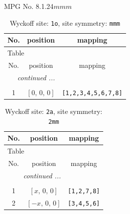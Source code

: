 \documentclass[fleqn,8pt]{jsarticle}
\begin{document}
\setcounter{MaxMatrixCols}{32}

\renewcommand{\tablename}{Table~}
\renewcommand{\figurename}{Figure~}
\begin{center}
\LARGE
MPG No. 8.1.24\quad$mmm$
\end{center}
\renewcommand{\arraystretch}{1.2}
\begin{longtable}{ccc}
\caption{Wyckoff site: {\tt 1o}, site symmetry: {\tt mmm}}
 \\
 \hline \hline
No. & position & mapping \\ \hline \endfirsthead

\multicolumn{2}{l}{\tablename\ \thetable{}} \\
 \hline \hline
No. & position & mapping \\ \hline \endhead

 \hline \hline
\multicolumn{2}{r}{\footnotesize\it continued ...} \\ \endfoot

 \hline \hline
\multicolumn{2}{r}{} \\ \endlastfoot

1 & $\left[ 0,\, 0,\, 0 \right]$ & {\tt [1,2,3,4,5,6,7,8]} \\
\end{longtable}
\renewcommand{\arraystretch}{1.2}
\begin{longtable}{ccc}
\caption{Wyckoff site: {\tt 2a}, site symmetry: {\tt 2mm}}
 \\
 \hline \hline
No. & position & mapping \\ \hline \endfirsthead

\multicolumn{2}{l}{\tablename\ \thetable{}} \\
 \hline \hline
No. & position & mapping \\ \hline \endhead

 \hline \hline
\multicolumn{2}{r}{\footnotesize\it continued ...} \\ \endfoot

 \hline \hline
\multicolumn{2}{r}{} \\ \endlastfoot

1 & $\left[ x,\, 0,\, 0 \right]$ & {\tt [1,2,7,8]} \\ \hline
2 & $\left[ - x,\, 0,\, 0 \right]$ & {\tt [3,4,5,6]} \\
\end{longtable}
\renewcommand{\arraystretch}{1.2}
\end{document}

